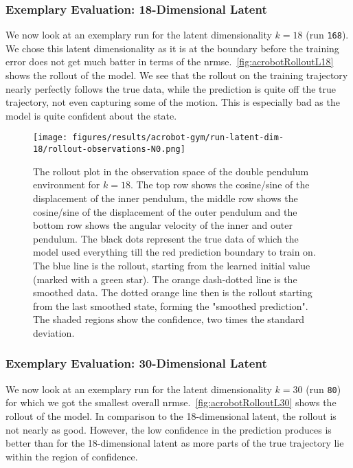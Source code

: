 		\subsubsection{Exemplary Evaluation: 18-Dimensional Latent}
			We now look at an exemplary run for the latent dimensionality \( k = 18 \) (run \texttt{168}). We chose this latent dimensionality as it is at the boundary before the training error does not get much batter in terms of the \ac{nrmse}.~\autoref{fig:acrobotRolloutL18} shows the rollout of the model. We see that the rollout on the training trajectory nearly perfectly follows the true data, while the prediction is quite off the true trajectory, not even capturing some of the motion. This is especially bad as the model is quite confident about the state.

			\begin{figure}
				\centering
				\texttt{[image: figures/results/acrobot-gym/run-latent-dim-18/rollout-observations-N0.png]}
				\caption[Rollout of the double pendulum experiment for 18 latent dimensions]{The rollout plot in the observation space of the double pendulum environment for \(k = 18\). The top row shows the cosine/sine of the displacement of the inner pendulum, the middle row shows the cosine/sine of the displacement of the outer pendulum and the bottom row shows the angular velocity of the inner and outer pendulum. The black dots represent the true data of which the model used everything till the red prediction boundary to train on. The blue line is the rollout, starting from the learned initial value (marked with a green star). The orange dash-dotted line is the smoothed data. The dotted orange line then is the rollout starting from the last smoothed state, forming the "smoothed prediction". The shaded regions show the confidence, \ie two times the standard deviation.}
				\label{fig:acrobotRolloutL18}
			\end{figure}

		\subsubsection{Exemplary Evaluation: 30-Dimensional Latent}
			We now look at an exemplary run for the latent dimensionality \( k = 30 \) (run \texttt{80}) for which we got the smallest overall \ac{nrmse}.~\autoref{fig:acrobotRolloutL30} shows the rollout of the model. In comparison to the 18-dimensional latent, the rollout is not nearly as good. However, the low confidence in the prediction produces is better than for the 18-dimensional latent as more parts of the true trajectory lie within the region of confidence.
